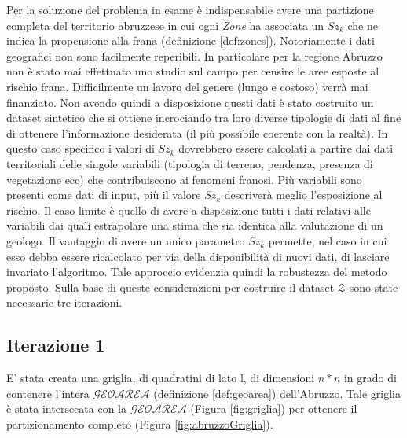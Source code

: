 Per la soluzione del problema in esame è indispensabile avere una partizione completa del territorio abruzzese in cui ogni \textit{Zone} ha associata un $Sz_k$ che ne indica la propensione alla frana (definizione \ref{def:zones}). Notoriamente i dati geografici non sono facilmente reperibili. In particolare per la regione Abruzzo non è stato mai effettuato uno studio sul campo per censire le aree esposte al rischio frana. Difficilmente un lavoro del genere (lungo e costoso) verrà mai finanziato. Non avendo quindi a disposizione questi dati è stato costruito un dataset sintetico che si ottiene incrociando tra loro diverse tipologie di dati al fine di ottenere l'informazione desiderata (il più possibile coerente con la realtà). In questo caso specifico i valori di $Sz_k$ dovrebbero essere calcolati a partire dai dati territoriali delle singole variabili (tipologia di terreno, pendenza, presenza di vegetazione ecc) che contribuiscono ai fenomeni franosi. Più variabili sono presenti come dati di input, più il valore $Sz_k$ descriverà meglio l'esposizione al rischio. Il caso limite è quello di avere a disposizione tutti i dati relativi alle variabili dai quali estrapolare una stima che sia identica alla valutazione di un geologo. Il vantaggio di avere un unico parametro $Sz_k$ permette, nel caso in cui esso debba essere ricalcolato per via della disponibilità di nuovi dati, di lasciare invariato l'algoritmo. Tale approccio evidenzia quindi la robustezza del metodo proposto. Sulla base di queste considerazioni per costruire il dataset $\mathcal{Z}$ sono state necessarie tre iterazioni.

\subsection{\textbf{Iterazione 1}}
E' stata creata una griglia, di quadratini di lato l, di dimensioni $n*n$ in grado di contenere l'intera  $\mathcal{GEOAREA}$ (definizione \ref{def:geoarea}) dell'Abruzzo. Tale griglia è stata intersecata con la  $\mathcal{GEOAREA}$ (Figura \ref{fig:griglia}) per ottenere il partizionamento completo (Figura \ref{fig:abruzzoGriglia}).  

